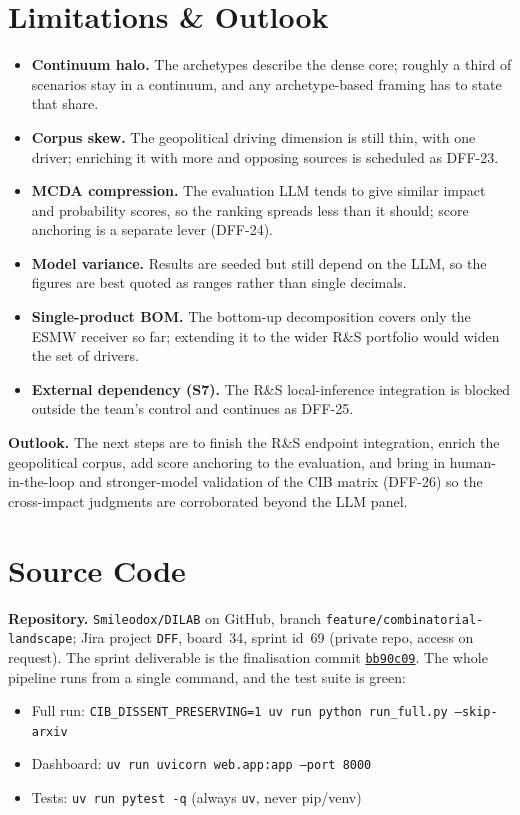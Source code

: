 \documentclass[11pt,a4paper]{article}
\newcommand{\code}[1]{\texttt{\small #1}}
\begin{document}
\section{Limitations \& Outlook}
\begin{itemize}
  \item \textbf{Continuum halo.} The archetypes describe the dense core; roughly a third of scenarios stay
  in a continuum, and any archetype-based framing has to state that share.
  \item \textbf{Corpus skew.} The geopolitical driving dimension is still thin, with one driver; enriching
  it with more and opposing sources is scheduled as DFF-23.
  \item \textbf{MCDA compression.} The evaluation LLM tends to give similar impact and probability scores,
  so the ranking spreads less than it should; score anchoring is a separate lever (DFF-24).
  \item \textbf{Model variance.} Results are seeded but still depend on the LLM, so the figures are best
  quoted as ranges rather than single decimals.
  \item \textbf{Single-product BOM.} The bottom-up decomposition covers only the ESMW receiver so far;
  extending it to the wider R\&S portfolio would widen the set of drivers.
  \item \textbf{External dependency (S7).} The R\&S local-inference integration is blocked outside the
  team's control and continues as DFF-25.
\end{itemize}
\textbf{Outlook.} The next steps are to finish the R\&S endpoint integration, enrich the geopolitical
corpus, add score anchoring to the evaluation, and bring in human-in-the-loop and stronger-model validation
of the CIB matrix (DFF-26) so the cross-impact judgments are corroborated beyond the LLM panel.

\section{Source Code}
\textbf{Repository.} \code{Smileodox/DILAB} on GitHub, branch \code{feature/combinatorial-landscape}; Jira
project \code{DFF}, board~34, sprint id~69 (private repo, access on request). The sprint deliverable is the
finalisation commit
\href{https://github.com/Smileodox/DILAB/commit/bb90c0989ea7903839f81b19cbb6565475e06bda}{\code{bb90c09}}.
The whole pipeline runs from a single command, and the test suite is green:
\begin{itemize}
  \item Full run: \code{CIB\_DISSENT\_PRESERVING=1 uv run python run\_full.py --skip-arxiv}
  \item Dashboard: \code{uv run uvicorn web.app:app --port 8000}
  \item Tests: \code{uv run pytest -q} \quad(always \code{uv}, never pip/venv)
\end{itemize}
\end{document}
